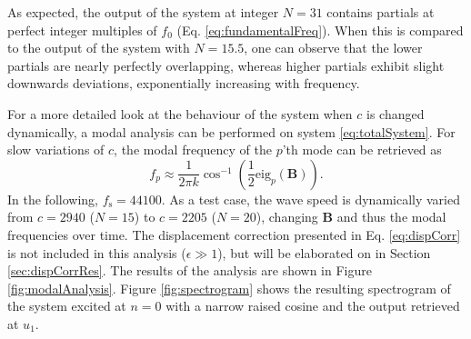 As expected, the output of the system at integer $N = 31$ contains partials at perfect integer multiples of $f_0$ (Eq. \eqref{eq:fundamentalFreq}). When this is compared to the output of the system with $N = 15.5$, one can observe that the lower partials are nearly perfectly overlapping, whereas higher partials exhibit slight downwards deviations, exponentially increasing with frequency.

For a more detailed look at the behaviour of the system when $c$ is changed dynamically, a modal analysis can be performed on system \eqref{eq:totalSystem}. For slow variations of $c$, the modal frequency of the $p$'th mode can be retrieved as
\begin{equation}\label{eq:modalAnalysis}
    f_p \approx \frac{1}{2\pi k}\cos^{-1}\left(\frac{1}{2}\text{eig}_p(\mathbf{B})\right).
\end{equation}
In the following, $f_\text{s} = 44100$.
As a test case, the wave speed is dynamically varied from $c = 2940$ ($N = 15$) to $c = 2205$ ($N = 20$), changing $\mathbf{B}$ and thus the modal frequencies over time. The displacement correction presented in Eq. \eqref{eq:dispCorr} is not included in this analysis ($\epsilon \gg 1$), but will be elaborated on in Section \ref{sec:dispCorrRes}. The results of the analysis are shown in Figure \ref{fig:modalAnalysis}. Figure \ref{fig:spectrogram} shows the resulting spectrogram of the system excited at $n=0$ with a narrow raised cosine and the output retrieved at $u_1$.

